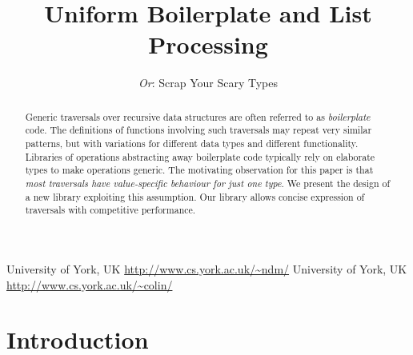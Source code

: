 \documentclass[preprint]{sigplanconf}
\newenvironment{code}{\begin{alltt}\small}{\end{alltt}}
\begin{document}
\copyrightdata{[to be supplied]}

\titlebanner{} %
\preprintfooter{}   %

\title{Uniform Boilerplate and List Processing}
\subtitle{\textit{Or}: Scrap Your Scary Types}

           {University of York, UK}
           {\url{http://www.cs.york.ac.uk/~ndm/}}
           {University of York, UK}
           {\url{http://www.cs.york.ac.uk/~colin/}}

\maketitle

\begin{abstract}
Generic traversals over recursive data structures are often referred to as \textit{boilerplate} code. The definitions of functions involving such traversals may repeat very similar patterns, but with variations for different data types and different functionality. Libraries of operations abstracting away boilerplate code typically rely on elaborate types to make operations generic. The motivating observation for this paper is that \textit{most traversals have value-specific behaviour for just one type}. We present the design of a new library exploiting this assumption. Our library allows concise expression of traversals with competitive performance.
\end{abstract}

\section{Introduction}
\end{document}
